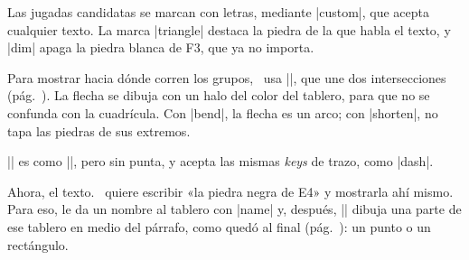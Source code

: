 \begin{goban}
\begin{codeexample}[width=4.8cm]
	\begin{goban}[partial = A1:G7, label = {at = {north, west}}]
	\end{goban}
\end{codeexample}

Las jugadas candidatas se marcan con letras, mediante |custom|, que acepta cualquier texto. La marca |triangle| destaca la piedra de la que habla el texto, y |dim| apaga la piedra blanca de F3, que ya no importa.

\begin{codeexample}[width=4.8cm]
	\begin{goban}[partial = A1:G7, label = {at = {north, west}}]
	\end{goban}
\end{codeexample}

Para mostrar hacia dónde corren los grupos, \karu\ usa |\arrow|, que une dos intersecciones (pág.~\pageref{subsec:flechas}). La flecha se dibuja con un halo del color del tablero, para que no se confunda con la cuadrícula. Con |bend|, la flecha es un arco; con |shorten|, no tapa las piedras de sus extremos.

\begin{codeexample}[width=4.8cm]
	\begin{goban}[partial = A1:G7, label = {at = {north, west}}]
	\end{goban}
\end{codeexample}

|\line| es como |\arrow|, pero sin punta, y acepta las mismas \emph{keys} de trazo, como |dash|.

\begin{codeexample}[width=4.8cm]
	\begin{goban}[partial = A1:G7, label = {at = {north, west}}]
	\end{goban}
\end{codeexample}

Ahora, el texto. \karu\ quiere escribir «la piedra negra de E4» y mostrarla ahí mismo. Para eso, le da un nombre al tablero con |name| y, después, |\pgfgoview| dibuja una parte de ese tablero en medio del párrafo, como quedó al final (pág.~\pageref{subsec:vistas}): un punto o un rectángulo.


\end{goban}
